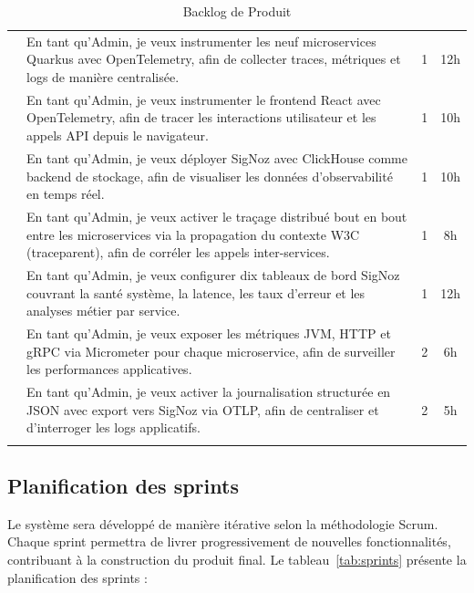 \begin{longtable}{|>{\centering\arraybackslash}p{2.8cm}|>{\raggedright\arraybackslash}p{8.5cm}|c|c|}
\multicolumn{4}{|l|}{\cellcolor{gray!20}\textbf{Sprint 8 : Services d'Observabilité}} \\ \hline
& En tant qu'Admin, je veux instrumenter les neuf microservices Quarkus avec OpenTelemetry, afin de collecter traces, métriques et logs de manière centralisée. & 1 & 12h \\ \hline
& En tant qu'Admin, je veux instrumenter le frontend React avec OpenTelemetry, afin de tracer les interactions utilisateur et les appels API depuis le navigateur. & 1 & 10h \\ \hline
& En tant qu'Admin, je veux déployer SigNoz avec ClickHouse comme backend de stockage, afin de visualiser les données d'observabilité en temps réel. & 1 & 10h \\ \hline
& En tant qu'Admin, je veux activer le traçage distribué bout en bout entre les microservices via la propagation du contexte W3C (traceparent), afin de corréler les appels inter-services. & 1 & 8h \\ \hline
& En tant qu'Admin, je veux configurer dix tableaux de bord SigNoz couvrant la santé système, la latence, les taux d'erreur et les analyses métier par service. & 1 & 12h \\ \hline
& En tant qu'Admin, je veux exposer les métriques JVM, HTTP et gRPC via Micrometer pour chaque microservice, afin de surveiller les performances applicatives. & 2 & 6h \\ \hline
& En tant qu'Admin, je veux activer la journalisation structurée en JSON avec export vers SigNoz via OTLP, afin de centraliser et d'interroger les logs applicatifs. & 2 & 5h \\ \hline

\caption{Backlog de Produit}
\label{tab:backlog}
\end{longtable}

\subsection{Planification des sprints}

Le système sera développé de manière itérative selon la méthodologie Scrum. Chaque sprint
permettra de livrer progressivement de nouvelles fonctionnalités, contribuant à la construction
du produit final. Le tableau~\ref{tab:sprints} présente la planification des sprints :

